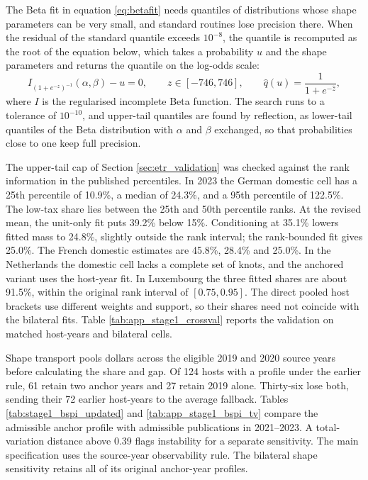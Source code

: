 \documentclass[11pt,a4paper]{article}
\begin{document}
The Beta fit in equation \eqref{eq:betafit} needs quantiles of distributions whose shape parameters can be very small, and standard routines lose precision there. When the residual of the standard quantile exceeds $10^{-8}$, the quantile is recomputed as the root of the equation below, which takes a probability $u$ and the shape parameters and returns the quantile on the log-odds scale:
\begin{equation}\label{eq:app_beta_root}
I_{\left(1+e^{-z}\right)^{-1}}(\alpha,\beta)-u=0,\qquad z\in[-746,746],\qquad \hat q(u)=\frac{1}{1+e^{-\hat z}},
\end{equation}
where $I$ is the regularised incomplete Beta function. The search runs to a tolerance of $10^{-10}$, and upper-tail quantiles are found by reflection, as lower-tail quantiles of the Beta distribution with $\alpha$ and $\beta$ exchanged, so that probabilities close to one keep full precision.

The upper-tail cap of Section \ref{sec:etr_validation} was checked against the rank information in the published percentiles. In 2023 the German domestic cell has a 25th percentile of 10.9\%, a median of 24.3\%, and a 95th percentile of 122.5\%. The low-tax share lies between the 25th and 50th percentile ranks. At the revised mean, the unit-only fit puts 39.2\% below 15\%. Conditioning at 35.1\% lowers fitted mass to 24.8\%, slightly outside the rank interval; the rank-bounded fit gives 25.0\%. The French domestic estimates are 45.8\%, 28.4\% and 25.0\%. In the Netherlands the domestic cell lacks a complete set of knots, and the anchored variant uses the host-year fit. In Luxembourg the three fitted shares are about 91.5\%, within the original rank interval of $[0.75,0.95]$. The direct pooled host brackets use different weights and support, so their shares need not coincide with the bilateral fits. Table \ref{tab:app_stage1_crossval} reports the validation on matched host-years and bilateral cells.



Shape transport pools dollars across the eligible 2019 and 2020 source years before calculating the share and gap. Of 124 hosts with a profile under the earlier rule, 61 retain two anchor years and 27 retain 2019 alone. Thirty-six lose both, sending their 72 earlier host-years to the average fallback. Tables \ref{tab:stage1_bspi_updated} and \ref{tab:app_stage1_bspi_tv} compare the admissible anchor profile with admissible publications in 2021–2023. A total-variation distance above 0.39 flags instability for a separate sensitivity. The main specification uses the source-year observability rule. The bilateral shape sensitivity retains all of its original anchor-year profiles.
\end{document}

